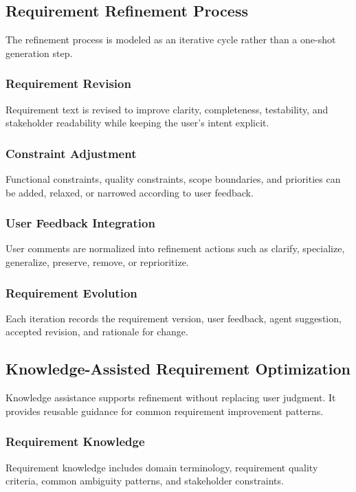 \subsection{Requirement Refinement Process}
\label{subsec:method-refinement}
The refinement process is modeled as an iterative cycle rather than a one-shot generation step.

\subsubsection{Requirement Revision}
\label{subsubsec:method-revision}
Requirement text is revised to improve clarity, completeness, testability, and stakeholder readability while keeping the user's intent explicit.

\subsubsection{Constraint Adjustment}
\label{subsubsec:method-constraint}
Functional constraints, quality constraints, scope boundaries, and priorities can be added, relaxed, or narrowed according to user feedback.

\subsubsection{User Feedback Integration}
\label{subsubsec:method-feedback-integration}
User comments are normalized into refinement actions such as clarify, specialize, generalize, preserve, remove, or reprioritize.

\subsubsection{Requirement Evolution}
\label{subsubsec:method-evolution}
Each iteration records the requirement version, user feedback, agent suggestion, accepted revision, and rationale for change.

\subsection{Knowledge-Assisted Requirement Optimization}
\label{subsec:method-knowledge}
Knowledge assistance supports refinement without replacing user judgment. It provides reusable guidance for common requirement improvement patterns.

\subsubsection{Requirement Knowledge}
\label{subsubsec:method-requirement-knowledge}
Requirement knowledge includes domain terminology, requirement quality criteria, common ambiguity patterns, and stakeholder constraints.

